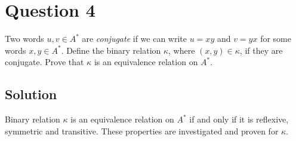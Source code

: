 
\section*{Question 4}

Two words $u, v \in A^*$ are \textit{conjugate} if we can write $u=xy$ and $v=yx$ for some words $x,y \in A^*$.
Define the binary relation $\kappa$, where $\left( x,y \right) \in \kappa$, if they are conjugate.
Prove that $\kappa$ is an equivalence relation on $A^* $.

\subsection*{Solution}

Binary relation $\kappa$ is an equivalence relation on $A^*$ if and only if it is reflexive, symmetric and transitive. These properties are investigated and proven for $\kappa$.

